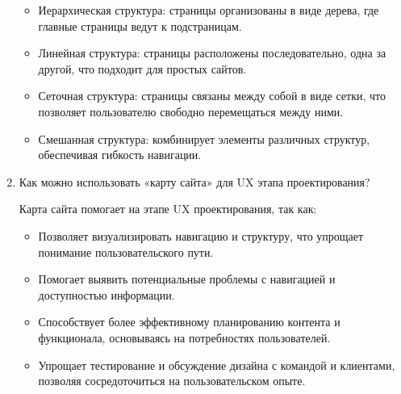 \begin{enumerate}
        \begin{itemize}
            \item Иерархическая структура: страницы организованы в виде дерева, где главные страницы ведут к подстраницам.
            \item Линейная структура: страницы расположены последовательно, одна за другой, что подходит для простых сайтов.
            \item Сеточная структура: страницы связаны между собой в виде сетки, что позволяет пользователю свободно перемещаться между ними.
            \item Смешанная структура: комбинирует элементы различных структур, обеспечивая гибкость навигации.
        \end{itemize}
    \item Как можно использовать «карту сайта» для UX этапа проектирования?

Карта сайта помогает на этапе UX проектирования, так как:
        \begin{itemize}
            \item Позволяет визуализировать навигацию и структуру, что упрощает понимание пользовательского пути.
            \item Помогает выявить потенциальные проблемы с навигацией и доступностью информации.
            \item Способствует более эффективному планированию контента и функционала, основываясь на потребностях пользователей.
            \item Упрощает тестирование и обсуждение дизайна с командой и клиентами, позволяя сосредоточиться на пользовательском опыте.
        \end{itemize}
\end{enumerate}


